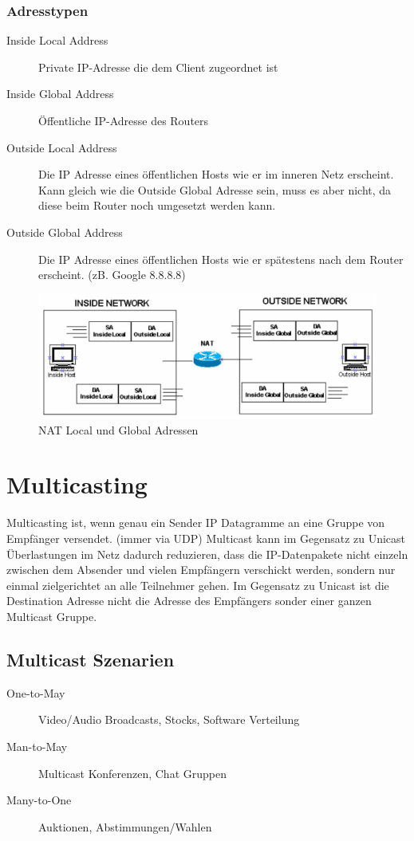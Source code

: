 \subsubsection{Adresstypen}
\begin{description}
	\item[Inside Local Address] Private IP-Adresse die dem Client zugeordnet ist
	\item[Inside Global Address] Öffentliche IP-Adresse des Routers
	\item[Outside Local Address] Die IP Adresse eines öffentlichen Hosts wie er im inneren Netz erscheint. Kann gleich wie die Outside Global Adresse sein, muss es aber nicht, da diese beim Router noch umgesetzt werden kann.
	\item[Outside Global Address] Die IP Adresse eines öffentlichen Hosts wie er spätestens nach dem Router erscheint. (zB. Google 8.8.8.8)
\end{description}
\begin{figure}[h]
\centering
\includegraphics[width=0.7\linewidth]{images/nat_addresses}
\caption{NAT Local und Global Adressen}
\label{fig:nataddresses}
\end{figure}


\section{Multicasting}
Multicasting ist, wenn genau ein Sender IP Datagramme an eine Gruppe von Empfänger versendet. (immer via UDP) Multicast kann im Gegensatz zu Unicast Überlastungen im Netz dadurch reduzieren, dass die IP-Datenpakete nicht einzeln zwischen dem Absender und vielen Empfängern verschickt werden, sondern nur einmal zielgerichtet an alle Teilnehmer gehen. Im Gegensatz zu Unicast ist die Destination Adresse nicht die Adresse des Empfängers sonder einer ganzen Multicast Gruppe. 

\subsection{Multicast Szenarien}
\begin{description}
	\item[One-to-May] Video/Audio Broadcasts, Stocks, Software Verteilung
	\item[Man-to-May] Multicast Konferenzen, Chat Gruppen
	\item[Many-to-One] Auktionen, Abstimmungen/Wahlen
\end{description}


